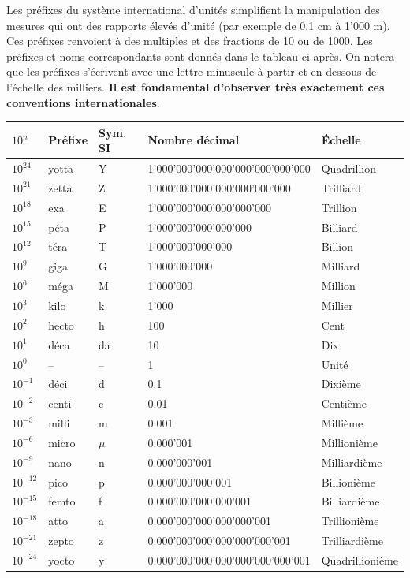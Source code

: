 Les préfixes du système international d'unités simplifient la manipulation des mesures qui ont des rapports élevés d'unité (par exemple de 0.1 cm à 1'000 m). Ces préfixes renvoient à des multiples et des fractions de 10 ou de 1000.  Les préfixes et noms correspondants sont donnés dans le tableau ci-après. On notera que les préfixes s'écrivent avec une lettre minuscule à partir et en dessous de l'échelle des milliers. \textbf{Il est fondamental d'observer très exactement ces conventions internationales}.

\begin{table}[htbp]
\begin{center}
\begin{tabular}{>{\pbs\raggedright}p{1cm}>{\pbs\raggedright}p{1.4cm}>{\pbs\centering}p{1.5cm}ll}
$10^n$ & Préfixe & Sym. SI & Nombre décimal & Échelle \\ \hline
$10^{24}$  & yotta &     Y & 1'000'000'000'000'000'000'000'000 & Quadrillion \\
$10^{21}$  & zetta &     Z & 1'000'000'000'000'000'000'000 & Trilliard \\
$10^{18}$  &   exa &     E & 1'000'000'000'000'000'000 & Trillion \\
$10^{15}$  &  péta &     P & 1'000'000'000'000'000 & Billiard \\
$10^{12}$  &  téra &     T & 1'000'000'000'000 & Billion \\
$10^{9}$   &  giga &     G & 1'000'000'000 & Milliard \\
$10^{6}$   &  méga &     M & 1'000'000 & Million \\
$10^{3}$   &  kilo &     k & 1'000 & Millier \\
$10^{2}$   & hecto &     h & 100 & Cent \\
$10^{1}$   &  déca &    da & 10 & Dix \\
$10^{0}$   &   --  &    -- & 1 & Unité \\
$10^{-1}$  &  déci &     d & 0.1	& Dixième \\
$10^{-2}$  & centi &     c & 0.01 & Centième \\
$10^{-3}$  & milli &     m & 0.001 & Millième \\
$10^{-6}$  & micro & $\mu$ & 0.000'001 & Millionième \\
$10^{-9}$  &  nano &     n & 0.000'000'001 & Milliardième \\
$10^{-12	}$ &  pico &     p & 0.000'000'000'001 & Billionième \\
$10^{-15	}$ & femto &     f & 0.000'000'000'000'001 & Billiardième \\
$10^{-18	}$ &  atto &     a & 0.000'000'000'000'000'001 & Trillionième \\
$10^{-21	}$ & zepto &     z & 0.000'000'000'000'000'000'001 & Trilliardième \\
$10^{-24	}$ & yocto &     y & 0.000'000'000'000'000'000'000'001 & Quadrillionième \\ \hline
\end{tabular}
\end{center}
\end{table}

